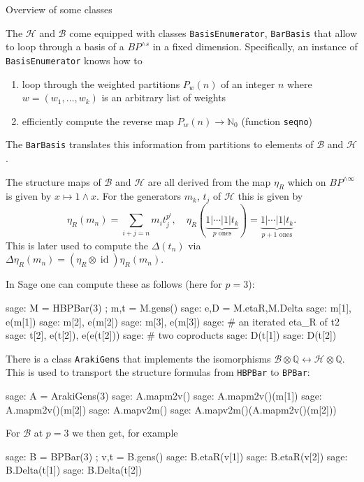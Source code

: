 \documentclass[a4paper]{paper}
\newcommand{\id}{\operatorname{id}}
\newcommand{\BP}{BP}
\newcommand{\QQ}{\mathbb Q}
\newcommand{\NN}{\mathbb N}
\newcommand{\stt}[1]{{\tt#1}}
\newcommand{\scrb}{{\mathcal B}}
\newcommand{\scrh}{{\mathcal H}}
\begin{document}
\begin{section}{Overview of some classes}

The $\scrh$ and $\scrb$ come equipped with classes \stt{BasisEnumerator}, \stt{BarBasis}
that allow to loop through a basis of
a $\BP^{\land s}$ in a fixed dimension.
Specifically, an instance of \stt{BasisEnumerator} knows how to
\begin{enumerate}
\item loop through the weighted partitions $P_w(n)$ of an integer $n$ where $w=(w_1,\ldots,w_k)$ is an arbitrary
list of weights
\item efficiently compute the reverse map $P_w(n)\rightarrow \NN_0$ (function \stt{seqno})
\end{enumerate}
The \stt{BarBasis} translates this information from partitions to elements of $\scrb$ and $\scrh$.

The structure maps of $\scrb$ and $\scrh$ are all derived from the map $\eta_R$
which on $\BP^{\land\infty}$ is given by $x\mapsto 1\land x$. For the generators $m_k$, $t_j$ of $\scrh$
this is given by
$$\eta_R(m_n) = \sum_{i+j=n} m_i t_j^{p^i},\quad
\eta_R(\underbrace{1\vert\cdots\vert1\vert t_k}_{\text{$p$ ones}})
= \underbrace{1\vert\cdots\vert1\vert t_k}_{\text{$p+1$ ones}}.
$$
This is later used to compute the $\Delta(t_n)$ via $\Delta\eta_R(m_n) = (\eta_R\otimes\id)\eta_R(m_n)$.

In Sage one can compute these as follows (here for $p=3$):
\begin{sagecommandline}
sage: M = HBPBar(3) ; m,t = M.gens()
sage: e,D = M.etaR,M.Delta
sage: m[1], e(m[1])
sage: m[2], e(m[2])
sage: m[3], e(m[3])
sage: # an iterated eta_R of t2
sage: t[2], e(t[2]), e(e(t[2]))
sage: # two coproducts
sage: D(t[1])
sage: D(t[2])
\end{sagecommandline}

There is a class \stt{ArakiGens} that implements the isomorphisms
$\scrb\otimes\QQ \leftrightarrow \scrh\otimes\QQ$. This is used to transport the structure formulas
from \stt{HBPBar} to \stt{BPBar}:
\begin{sagecommandline}
sage: A = ArakiGens(3)
sage: A.mapm2v()
sage: A.mapm2v()(m[1])
sage: A.mapm2v()(m[2])
sage: A.mapv2m()
sage: A.mapv2m()(A.mapm2v()(m[2]))
\end{sagecommandline}

For $\scrb$ at $p=3$ we then get, for example
\begin{sagecommandline}
sage: B = BPBar(3) ; v,t = B.gens()
sage: B.etaR(v[1])
sage: B.etaR(v[2])
sage: B.Delta(t[1])
sage: B.Delta(t[2])
\end{sagecommandline}


\end{section}
\end{document}
